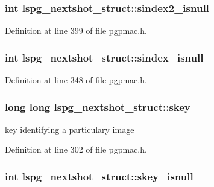 \hypertarget{structlspg__nextshot__struct_a28e0b5c32a2741ef22edeb9d35b04e4d}{
\subsubsection[{sindex2\-\_\-isnull}]{\setlength{\rightskip}{0pt plus 5cm}int lspg\-\_\-nextshot\-\_\-struct\-::sindex2\-\_\-isnull}}\label{structlspg__nextshot__struct_a28e0b5c32a2741ef22edeb9d35b04e4d}


Definition at line 399 of file pgpmac.\-h.

\hypertarget{structlspg__nextshot__struct_a7ca4fbc86974d1b75a681ba5ecaaf5af}{
\subsubsection[{sindex\-\_\-isnull}]{\setlength{\rightskip}{0pt plus 5cm}int lspg\-\_\-nextshot\-\_\-struct\-::sindex\-\_\-isnull}}\label{structlspg__nextshot__struct_a7ca4fbc86974d1b75a681ba5ecaaf5af}


Definition at line 348 of file pgpmac.\-h.

\hypertarget{structlspg__nextshot__struct_af64a4e3f17752b5f1f05fb15d6f48382}{
\subsubsection[{skey}]{\setlength{\rightskip}{0pt plus 5cm}long long lspg\-\_\-nextshot\-\_\-struct\-::skey}}\label{structlspg__nextshot__struct_af64a4e3f17752b5f1f05fb15d6f48382}


key identifying a particulary image 



Definition at line 302 of file pgpmac.\-h.

\hypertarget{structlspg__nextshot__struct_abd3c69357470052eb79ddd8eddd57b2c}{
\subsubsection[{skey\-\_\-isnull}]{\setlength{\rightskip}{0pt plus 5cm}int lspg\-\_\-nextshot\-\_\-struct\-::skey\-\_\-isnull}}\label{structlspg__nextshot__struct_abd3c69357470052eb79ddd8eddd57b2c}


